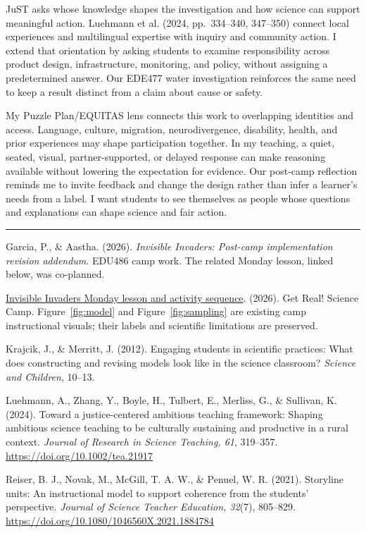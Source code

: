 \documentclass[11pt]{article}
\newcommand{\secx}[1]{\par\Needspace{5\baselineskip}\addvspace{0.10in}{\Large\bfseries\color{PrimaryRed}#1}\par\color{DeepNavy}\hrule\color{black}\vspace{0.08in}}
\begin{document}
JuST asks whose knowledge shapes the investigation and how science can support meaningful action. Luehmann et al. (2024, pp.~334--340, 347--350) connect local experiences and multilingual expertise with inquiry and community action. I extend that orientation by asking students to examine responsibility across product design, infrastructure, monitoring, and policy, without assigning a predetermined answer. Our EDE477 water investigation reinforces the same need to keep a result distinct from a claim about cause or safety.

My Puzzle Plan/EQUITAS lens connects this work to overlapping identities and access. Language, culture, migration, neurodivergence, disability, health, and prior experiences may shape participation together. In my teaching, a quiet, seated, visual, partner-supported, or delayed response can make reasoning available without lowering the expectation for evidence. Our post-camp reflection reminds me to invite feedback and change the design rather than infer a learner's needs from a label. I want students to see themselves as people whose questions and explanations can shape science and fair action.

\newpage\secx{References and Source Notes}
Garcia, P., \& Aastha. (2026). \textit{Invisible Invaders: Post-camp implementation revision addendum}. EDU486 camp work. The related Monday lesson, linked below, was co-planned.

\href{https://docs.google.com/document/d/1jc_dSOKXVhSoSbvfbivXlgfYOxrrJ2L6KwbR7LQZCLc/edit}{Invisible Invaders Monday lesson and activity sequence}. (2026). Get Real! Science Camp. Figure~\ref{fig:model} and Figure~\ref{fig:sampling} are existing camp instructional visuals; their labels and scientific limitations are preserved.

Krajcik, J., \& Merritt, J. (2012). Engaging students in scientific practices: What does constructing and revising models look like in the science classroom? \textit{Science and Children}, 10--13.

Luehmann, A., Zhang, Y., Boyle, H., Tulbert, E., Merliss, G., \& Sullivan, K. (2024). Toward a justice-centered ambitious teaching framework: Shaping ambitious science teaching to be culturally sustaining and productive in a rural context. \textit{Journal of Research in Science Teaching, 61}, 319--357. \url{https://doi.org/10.1002/tea.21917}

Reiser, B. J., Novak, M., McGill, T. A. W., \& Penuel, W. R. (2021). Storyline units: An instructional model to support coherence from the students' perspective. \textit{Journal of Science Teacher Education, 32}(7), 805--829. \url{https://doi.org/10.1080/1046560X.2021.1884784}
\end{document}
